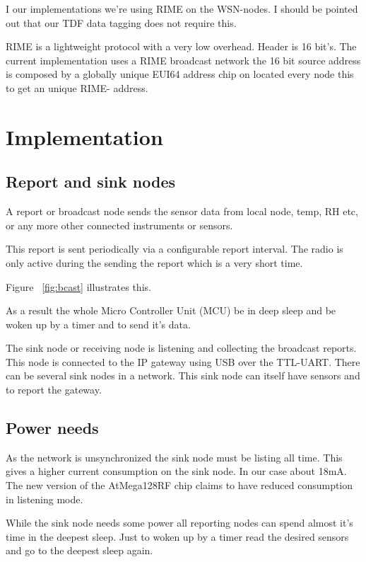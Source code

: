 \documentclass[conference, a4paper,10pt,twocolumn]{IEEEtran}
\begin{document}
I our implementations we're using RIME on the WSN-nodes. I should
be pointed out that our TDF data tagging does not require this.

RIME is a lightweight protocol with a very low overhead. Header is 
16 bit's. The current implementation uses a RIME broadcast network
the 16 bit source address is composed by a globally unique EUI64 
address chip on located every node this to get an unique RIME-
address. 



\section{Implementation}
\label{sec:implementation}



\subsection{Report and sink nodes}

A report or broadcast node sends the sensor data from local 
node, temp, RH etc, or any more other connected instruments 
or sensors.

This report is sent periodically via a configurable report
interval. The radio is only active during the sending the 
report which is a very short time.

Figure ~\ref{fig:bcast} illustrates this.

As a result the whole Micro Controller Unit (MCU) be in deep 
sleep and be woken up by a timer and to send it's data.

The sink node or receiving node is listening and collecting
the broadcast reports. This node is connected to the IP gateway
using USB over the TTL-UART.  There can be several sink nodes
in a network. This sink node can itself have sensors and to
report the gateway.

\subsection{Power needs}

As the network is unsynchronized the sink node must be listing
all time. This gives a higher current consumption on the sink node. 
In our case about 18mA. The new version of the AtMega128RF chip 
claims to have reduced consumption in listening mode. ~\cite{ATMEGA}

While the sink node needs some power all reporting nodes 
can spend almost it's time in the deepest sleep. Just to woken 
up by a timer read the desired sensors and go to the deepest 
sleep again. 
\end{document}

